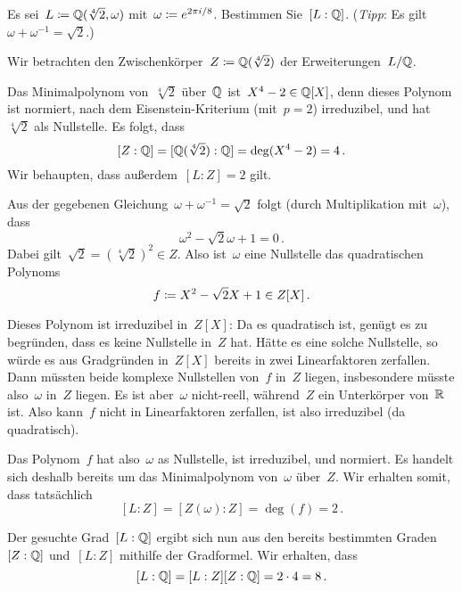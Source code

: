 \documentclass{scrartcl}
\begin{document}
\begin{exercise}[subtitle = {Erstklausur~18/19}]
  Es sei~$L \coloneqq \mathbb{Q}(\sqrt[4]{2}, \omega)$ mit~$\omega \coloneqq e^{2 \pi i / 8}$.
  Bestimmen Sie~$[L : \mathbb{Q}]$.
  (\emph{Tipp}: Es gilt~$\omega + \omega^{-1} = \sqrt{2}$.)
\end{exercise}

\begin{solution}
  Wir betrachten den Zwischenkörper~$Z \coloneqq \mathbb{Q}(\sqrt[4]{2})$ der Erweiterungen~$L / \mathbb{Q}$.

  Das Minimalpolynom von~$\sqrt[4]{2}$ über~$\mathbb{Q}$ ist~$X^4 - 2 \in \mathbb{Q}[X]$, denn dieses Polynom ist normiert, nach dem Eisenstein-Kriterium (mit~$p = 2$) irreduzibel, und hat~$\sqrt[4]{2}$ als Nullstelle.
  Es folgt, dass
  \[
    [Z : \mathbb{Q}]
    =
    [ \mathbb{Q}(\sqrt[4]{2}) : \mathbb{Q} ]
    =
    \deg( X^4 - 2)
    =
    4 \,.
  \]
  Wir behaupten, dass außerdem~$[L : Z] = 2$ gilt.

  Aus der gegebenen Gleichung~$\omega + \omega^{-1} = \sqrt{2}$ folgt (durch Multiplikation mit~$\omega$), dass
  \[
    \omega^2 - \sqrt{2} \omega + 1 = 0 \,.
  \]
  Dabei gilt~$\sqrt{2} = ( \sqrt[4]{2} )^2 \in Z$.
  Also ist~$\omega$ eine Nullstelle das quadratischen Polynoms
  \[
    f
    \coloneqq
    X^2 - \sqrt{2} X + 1
    \in
    Z[X] \,.
  \]

  Dieses Polynom ist irreduzibel in~$Z[X]$:
  Da es quadratisch ist, genügt es zu begründen, dass es keine Nullstelle in~$Z$ hat.
  Hätte es eine solche Nullstelle, so würde es aus Gradgründen in~$Z[X]$ bereits in zwei Linearfaktoren zerfallen.
  Dann müssten beide komplexe Nullstellen von~$f$ in~$Z$ liegen, insbesondere müsste also~$\omega$ in~$Z$ liegen.
  Es ist aber~$\omega$ nicht-reell, während~$Z$ ein Unterkörper von~$\mathbb{R}$ ist.
  Also kann~$f$ nicht in Linearfaktoren zerfallen, ist also irreduzibel (da quadratisch).

  Das Polynom~$f$ hat also~$\omega$ as Nullstelle, ist irreduzibel, und normiert.
  Es handelt sich deshalb bereits um das Minimalpolynom von~$\omega$ über~$Z$.
  Wir erhalten somit, dass tatsächlich
  \[
    [L : Z]
    =
    [Z(\omega) : Z]
    =
    \deg(f)
    =
    2 \,.
  \]

  Der gesuchte Grad~$[L : \mathbb{Q}]$ ergibt sich nun aus den bereits bestimmten Graden~$[Z : \mathbb{Q}]$ und~$[L : Z]$ mithilfe der Gradformel.
  Wir erhalten, dass
  \[
    [L : \mathbb{Q}]
    =
    [L : Z] [Z : \mathbb{Q}] 
    =
    2 \cdot 4
    =
    8 \,.
  \]
\end{solution}
\end{document}
